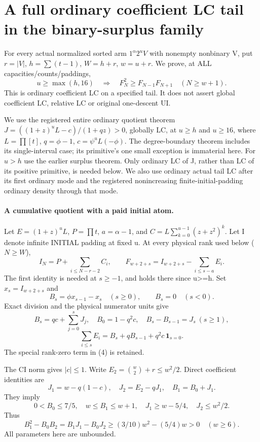 \section{A full ordinary coefficient LC tail in the binary-surplus family}
For every actual normalized sorted arm $1^\alpha2^uV$ with nonempty
nonbinary V, put $r=|V|$, $h=\sum(t-1)$, $W=h+r$, $w=u+r$.
We prove, at ALL capacities/counts/paddings,
\[
 u\ge\max(h,16)\quad\Longrightarrow\quad
 F_N^2\ge F_{N-1}F_{N+1}\quad(N\ge w+1).             \tag{1}
\]
This is ordinary coefficient LC on a specified tail. It does not
assert global coefficient LC, relative LC or original one-descent UI.

We use the registered entire ordinary quotient theorem
$J=((1+z)^uL-c)/(1+qz)>0$, globally LC, at $u\ge h$ and $u\ge16$,
where $L=\prod[t]$, $q=\phi-1$, $c=\psi^uL(-\phi)$.
The degree-boundary theorem includes its single-interval case;
its primitive's one small exception is immaterial here.
For $u>h$ use the earlier surplus theorem. Only ordinary LC of J,
rather than LC of its positive primitive, is needed below.
We also use ordinary actual tail LC after its first ordinary mode
and the registered nonincreasing finite-initial-padding ordinary
density through that mode.

\paragraph{A cumulative quotient with a paid initial atom.}
Let $E=(1+z)^uL$, $P=\prod t$, $a=\alpha-1$, and
$C=L\sum_{k=0}^{u-1}(z+z^2)^k$.
Let I denote infinite INITIAL padding at fixed u.
At every physical rank used below ($N\ge W$),
\[
 I_N=P+\sum_{i\le N-r-2}C_i,\qquad
 F_{w+2+s}=I_{w+2+s}-\sum_{i\le s-a}E_i.              \tag{2}
\]
The first identity is needed at $s\ge-1$, and holds there since u>=h.
Set $x_s=I_{w+2+s}$ and
\[
 B_s=\phi x_{s-1}-x_s\quad(s\ge0),\qquad B_s=0\quad(s<0).
\]
Exact division and the physical numerator units give
\[
 B_s=qc+\sum_{j=0}^sJ_j,\quad B_0=1-q^2c,\quad
 B_s-B_{s-1}=J_s\ (s\ge1),                          \tag{3}
\]
\[
 \sum_{i\le s}E_i=B_s+qB_{s-1}+q^2c\,\mathbf1_{s=0}.
                                                                  \tag{4}
\]
The special rank-zero term in (4) is retained.

The CI norm gives $|c|\le1$. Write $E_2=\binom w2+r\le w^2/2$.
Direct coefficient identities are
\[
 J_1=w-q(1-c),\quad J_2=E_2-qJ_1,\quad B_1=B_0+J_1.
\]
They imply
\[
 0<B_0\le7/5,\quad w\le B_1\le w+1,\quad
 J_1\ge w-5/4,\quad J_2\le w^2/2.
\]
Thus
\[
 B_1^2-B_0B_2=B_1J_1-B_0J_2
 \ge (3/10)w^2-(5/4)w>0\quad(w\ge6).                \tag{5}
\]
All parameters here are unbounded.

